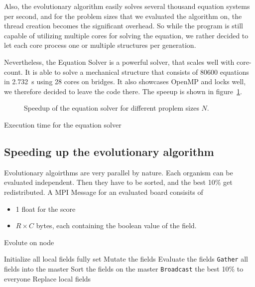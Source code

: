 \documentclass[12pt]{article}
\begin{document}
Also, the evolutionary algorithm easily solves several thousand equation systems per second, and for the problem sizes that we evaluated the algorithm on, the thread creation becomes the significant overhead. So while the program is still capable of utilizing multiple cores for solving the equation, we rather decided to let each core process one or multiple structures per generation.

Nevertheless, the Equation Solver is a powerful solver, that scales well with core-count. It is able to solve a mechanical structure that consists of 80600 equations in \SI{2.732}{\second} using 28 cores on bridges. It also showcases OpenMP and locks well, we therefore decided to leave the code there. The speeup is shown in figure~\ref{fig:Speedup}.

\begin{figure}[t]
    \centering
    
    \caption{Speedup of the equation solver for different proplem sizes $N$.}
    \label{fig:Speedup}
\end{figure}

\begin{table}[t]
    \centering
    
    \caption{Execution time for the equation solver}
    \label{tab:Speedup}
\end{table}

\subsection{Speeding up the evolutionary algorithm}

Evolutionary algoirthms are very parallel by nature. Each organism can be evaluated independent. Then they have to be sorted, and the best 10\% get redistributed. A MPI Message for an evaluated board consisits of

\begin{itemize}
    \item 1 float for the score
    \item $R \times C$ bytes, each containing the boolean value of the field.
\end{itemize}

\begin{algorithm}[t]
    \caption{Evolute on node}
    \begin{algorithmic}
        \STATE Initialize all local fields fully set
            \STATE Mutate the fields
            \STATE Evaluate the fields
            \STATE \texttt{Gather} all fields into the master
            \STATE Sort the fields on the master
            \STATE \texttt{Broadcast} the best 10\% to everyone
            \STATE Replace local fields
        \ENDFOR
    \end{algorithmic}
    \label{alg:Evolution}
\end{algorithm}
\end{document}
